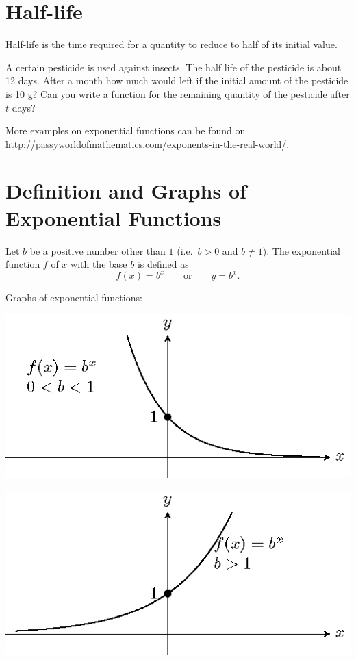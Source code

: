 \documentclass[en,11pt]{elegantbook}
\newcommand{\size}[2]{{\fontsize{#1}{0}\selectfont#2}}
\newenvironment{rmdthink}{
	\vspace*{0.5\baselineskip}
	\par\noindent
	\makebox[-4pt][r]{\color{green!90}\size{12}{\faLightbulbO}\,\,}
    \begin{tcolorbox}[
    enhanced,
    title={\textbf{\color{second}Think}},
    title style={left color=blue!10!green!20!white,right color=yellow!20!blue!20!white},
    colback=green!20!white,
    ]
    \sffamily
}{
    \end{tcolorbox}
	\par\ignorespacesafterend
}
\begin{document}
\hypertarget{half-life}{%
\section{Half-life}\label{half-life}}

\begin{rmdthink}

Half-life is the time required for a quantity to reduce to half of its initial value.

A certain pesticide is used against insects. The half life of the pesticide is about 12 days. After a month how much would left if the initial amount of the pesticide is 10 g? Can you write a function for the remaining quantity of the pesticide after \(t\) days?

\end{rmdthink}

More examples on exponential functions can be found on \url{http://passyworldofmathematics.com/exponents-in-the-real-world/}.

\hypertarget{definition-and-graphs-of-exponential-functions}{%
\section{Definition and Graphs of Exponential Functions}\label{definition-and-graphs-of-exponential-functions}}

Let \(b\) be a positive number other than \(1\) (i.e.~\(b>0\) and \(b\neq 1\)). The exponential function \(f\) of \(x\) with the base \(b\) is defined as
\[
f(x)=b^x\quad\quad\text{or}\quad\quad y=b^x.
\]

Graphs of exponential functions:

\begin{multicols}{2}

\begin{center}\includegraphics[width=0.5\linewidth]{figs/tikz-example-exp-function-1} \end{center}

\begin{center}\includegraphics[width=0.5\linewidth]{figs/tikz-example-exp-function-2} \end{center}

\end{multicols}
\end{document}
